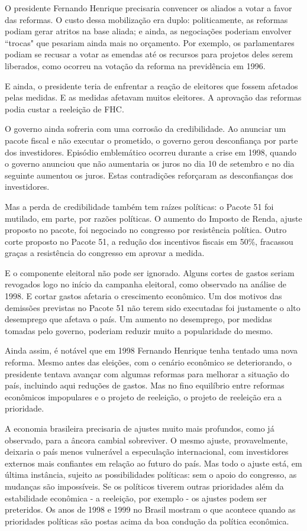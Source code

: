 \documentclass{article}
\begin{document}
O presidente Fernando Henrique precisaria convencer os aliados a votar a favor das reformas. O custo dessa mobilização era duplo: politicamente, as reformas podiam gerar atritos na base aliada; e ainda, as negociações poderiam envolver ``trocas" que pesariam ainda mais no orçamento. Por exemplo, os parlamentares podiam se recusar a votar as emendas até os recursos para projetos deles serem liberados, como ocorreu na votação da reforma na previdência em 1996. 

E ainda, o presidente teria de enfrentar a reação de eleitores que fossem afetados pelas medidas. E as medidas afetavam muitos eleitores. A aprovação das reformas podia custar a reeleição de FHC. %

O governo ainda sofreria com uma corrosão da credibilidade. Ao anunciar um pacote fiscal e não executar o prometido, o governo gerou desconfiança por parte dos investidores. Episódio emblemático ocorreu durante a crise em 1998, quando o governo anunciou que não aumentaria os juros no dia 10 de setembro e no dia seguinte aumentou os juros. Estas contradições reforçaram as desconfianças dos investidores. 

Mas a perda de credibilidade também tem raízes políticas: o Pacote 51 foi mutilado, em parte, por razões políticas. O aumento do Imposto de Renda, ajuste proposto no pacote, foi negociado no congresso por resistência política. Outro corte proposto no Pacote 51, a redução dos incentivos fiscais em 50\%, fracassou graças a resistência do congresso em aprovar a medida. 

E o componente eleitoral não pode ser ignorado. Alguns cortes de gastos seriam revogados logo no início da campanha eleitoral, como observado na análise de 1998. E cortar gastos afetaria o crescimento econômico. Um dos motivos das demissões previstas no Pacote 51 não terem sido executadas foi justamente o alto desemprego que afetava o país. Um aumento no desemprego, por medidas tomadas pelo governo, poderiam reduzir muito a popularidade do mesmo.

Ainda assim, é notável que em 1998 Fernando Henrique tenha tentado uma nova reforma. Mesmo antes das eleições, com o cenário econômico se deteriorando, o presidente tentava avançar com algumas reformas para melhorar a situação do país, incluindo aqui reduções de gastos. Mas no fino equilíbrio entre reformas econômicos impopulares e o projeto de reeleição, o projeto de reeleição era a prioridade.

A economia brasileira precisaria de ajustes muito mais profundos, como já observado, para a âncora cambial sobreviver. O mesmo ajuste, provavelmente, deixaria o país menos vulnerável a especulação internacional, com investidores externos mais confiantes em relação ao futuro do país. Mas todo o ajuste está, em última instância, sujeito as possibilidades políticas: sem o apoio do congresso, as mudanças são impossíveis. Se os políticos tiverem outras prioridades além da estabilidade econômica - a reeleição, por exemplo - os ajustes podem ser preteridos. Os anos de 1998 e 1999 no Brasil mostram o que acontece quando as prioridades políticas são postas acima da boa condução da política econômica.   
\end{document}
